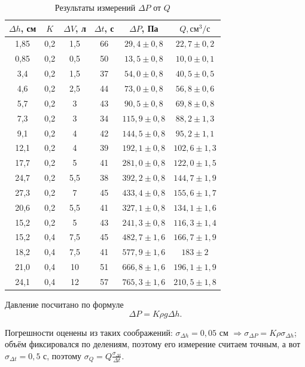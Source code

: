 \documentclass[12pt]{article}
\begin{document}
	\begin{table}[!h]
		\caption{Результаты измерений $\Delta P$ от $Q$}
		\label{tbl:res_p_q}
		\begin{center}
		\begin{tabular}{|c|c|c|c|c|c|}
			\hline
			$\Delta h$, см & $K$ & $\Delta V$, л & $\Delta t$, с & $\Delta P$, Па & $Q, \text{см}^3/\text{с}$ \\
			\hline
			1,85 & 0,2 & 1,5 & 66 & $29{,}4\pm 0{,}8$ & $22{,}7\pm 0{,}2$ \\
			0,85 & 0,2 & 0,5 & 50 & $13{,}5\pm 0{,}8$ & $10{,}0\pm 0{,}1$ \\
			3,4 & 0,2 & 1,5 & 37 & $54{,}0\pm 0{,}8$ & $40{,}5\pm 0{,}5$ \\
			4,6 & 0,2 & 2,5 & 44 & $73{,}0\pm 0{,}8$ & $56{,}8\pm 0{,}6$ \\
			5,7 & 0,2 & 3 & 43 & $90{,}5\pm 0{,}8$ & $69{,}8\pm 0{,}8$ \\
			7,3 & 0,2 & 3 & 34 & $115{,}9\pm 0{,}8$ & $88{,}2\pm 1{,}3$ \\
			9,1 & 0,2 & 4 & 42 & $144{,}5\pm 0{,}8$ & $95{,}2\pm 1{,}1$ \\
			12,1 & 0,2 & 4 & 39 & $192{,}1\pm 0{,}8$ & $102{,}6\pm 1{,}3$ \\
			17,7 & 0,2 & 5 & 41 & $281{,}0\pm 0{,}8$ & $122{,}0\pm 1{,}5$ \\
			24,7 & 0,2 & 5,5 & 38 & $392{,}2\pm 0{,}8$ & $144{,}7\pm 1{,}9$ \\
			27,3 & 0,2 & 7 & 45 & $433{,}4\pm 0{,}8$ & $155{,}6\pm 1{,}7$ \\
			20,6 & 0,2 & 5,5 & 41 & $327{,}1\pm 0{,}8$ & $134{,}1\pm 1{,}6$ \\
			15,2 & 0,2 & 5 & 43 & $241{,}3\pm 0{,}8$ & $116{,}3\pm 1{,}4$ \\
			15,2 & 0,4 & 7,5 & 45 & $482{,}7\pm 1{,}6$ & $166{,}7\pm 1{,}9$ \\
			18,2 & 0,4 & 7,5 & 41 & $577{,}9\pm 1{,}6$ & $183\pm 2$ \\
			21,0 & 0,4 & 10 & 51 & $666{,}8\pm 1{,}6$ & $196{,}1\pm 1{,}9$ \\
			24,1 & 0,4 & 12 & 57 & $765{,}3\pm 1{,}6$ & $210{,}5\pm 1{,}8$ \\
			\hline
		\end{tabular}
		\end{center}
	\end{table}
	
	Давление посчитано по формуле
	$$ \Delta P = K\rho g \Delta h. $$
	
	Погрешности оценены из таких соображений: $\sigma_{\Delta h}=0{,}05$ см $\Rightarrow \sigma_{\Delta P}=K \rho \sigma_{\Delta h}$; объём фиксировался по делениям, поэтому его измерение считаем точным, а вот $\sigma_{\Delta t}=0{,}5$ с, поэтому $\sigma_Q=Q \frac{\sigma_{\Delta t}}{\Delta t}$.
	
\end{document}
